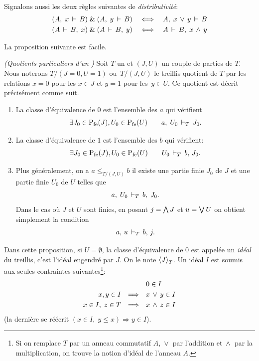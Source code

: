 Signalons aussi les deux règles suivantes de \emph{distributivité}:
$$\begin{array}{rcl}
(A,\;x \,\vdash\, B)\;\& \;(A,\;y \,\vdash\, B)  &  \;  \Longleftrightarrow  \; &
A,\;x\,\vee\, y \,\vdash\, B  \\[.3em]
(A\,\vdash\, B,\;x )\;\&\;(A \,\vdash\, B,\;y)  &   \Longleftrightarrow  &
A\,\vdash\, B,\;x\,\wedge\, y
\end{array}$$


La proposition suivante est facile.
\begin{propdef}
\label{propIdealFiltre} \emph{(Quotients particuliers d'un \trdi)}
Soit $T$ un \trdi et
$(J,U)$ un couple de parties de $T$.
Nous noterons $T/(J=0,U=1)$ \hbox{ou $T/(J,U)$} le treillis quotient
 de $T$ par les
relations $x=0$ pour les $x\in J$ et $y=1$ pour \hbox{les $y\in U$}. Ce quotient est décrit précisément comme suit.
\begin{enumerate}
\item  La classe d'équivalence de $0$ est l'ensemble des $a$ qui
vérifient
$$ \exists J_0\in{{\rm P}_{{\rm fe}}}(J), U_0\in{{\rm P}_{{\rm fe}}}(U) \qquad
a,\; U_0  \,\vdash_{T}\,    J_0.
$$
\item  La classe d'équivalence de $1$  est l'ensemble des $b$ qui
vérifient:
$$  \exists J_0\in{{\rm P}_{{\rm fe}}}(J), U_0\in{{\rm P}_{{\rm fe}}}(U)\qquad
 U_0  \,\vdash_{T}\,   b,\, J_0.
$$
\item  Plus généralement, on a $a\leq_{T/(J,U)}b$ \ssi
il existe une partie finie $J_0$ de $J$ et une partie finie $U_0$ de
$U$ telles que
$$  a,\; U_0 \,\vdash_{T}\,  b,\; J_0.
$$
Dans le cas où $J$ et $U$ sont finies, en posant $j=\bigwedge J$ et $u=\bigvee U$ on obtient simplement la condition 
$$  a,\, u \,\vdash_{T}\,  b,\,j .
$$
\end{enumerate}
\end{propdef}


Dans cette proposition, si $U=\emptyset$, la classe d'équivalence de $0$ est appelée un {\em idéal} du treillis, c'est l'idéal engendré par $J$. On le note $\left\langle{J}\right\rangle_T$. Un idéal $I$ est soumis aux seules contraintes suivantes\footnote{Si on remplace $T$ par un anneau commutatif $A$, $\,\vee\,$ par l'addition et $\,\wedge\,$ par la multiplication, on trouve la notion d'idéal de l'anneau $A$.}:
$$\begin{array}{rcl}
  & &  0 \in I   \\[.3em]
x,y\in I& \Longrightarrow   &  x\,\vee\, y \in I   \\[.3em]
x\in I,\; z\in T& \Longrightarrow   &  x\,\wedge\, z \in I   
\end{array}$$
(la dernière se réécrit $(x\in I,\;y\leq x)\Rightarrow y\in I$).


